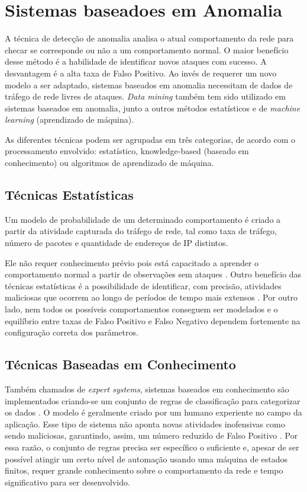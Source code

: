 \chapter{Sistemas baseadoes em Anomalia}
\label{ch:anids}
 A técnica de detecção de anomalia analisa o atual comportamento da rede para checar se corresponde ou não a um
 comportamento normal. O maior benefício desse método é a habilidade de identificar novos ataques com sucesso.
 A desvantagem é a alta taxa de Falso Positivo. Ao invés de requerer um novo modelo a ser adaptado, sistemas baseados
 em anomalia necessitam de dados de tráfego de rede livres de ataques. \textit{Data mining} também tem sido
 utilizado em sistemas baseados em anomalia, junto a outros métodos estatísticos e de \textit{machine learning}
 (aprendizado de máquina).
 \par As diferentes técnicas podem ser agrupadas em três categorias, de acordo com o processamento envolvido:
 estatístico, knowledge-based (baseado em conhecimento) ou algoritmos de aprendizado de máquina.

\section{Técnicas Estatísticas}
Um modelo de probabilidade de um determinado comportamento é criado a partir da atividade capturada do tráfego de rede,
 tal como taxa de tráfego, número de pacotes e quantidade de endereços de IP distintos.
 \par Ele não requer conhecimento prévio pois está capacitado a aprender o comportamento normal a partir de observações
 sem ataques \cite{lunt89}. Outro benefício das técnicas estatísticas é a possibilidade de identificar, com precisão, atividades
 maliciosas que ocorrem ao longo de períodos de tempo mais extensos \cite{catania12}. Por outro lado, nem todos os possíveis
 comportamentos conseguem ser modelados e o equilíbrio entre taxas de Falso Positivo e Falso Negativo dependem
 fortemente na configuração correta dos parâmetros.

 \section{Técnicas Baseadas em Conhecimento}
 Também chamados de \emph{expert systems}, sistemas baseados em conhecimento são implementados criando-se um conjunto de
 regras de classificação para categorizar os dados \cite{lunt89}. O modelo é geralmente criado por um humano experiente no campo
 da aplicação. Esse tipo de sistema não aponta novas atividades inofensivas como sendo maliciosas, garantindo, assim,
 um número reduzido de Falso Positivo \cite{catania12}. Por essa razão, o conjunto de regras precisa ser específico o suficiente e,
 apesar de ser possível atingir um certo nível de automação usando uma máquina de estados finitos, requer
 grande conhecimento sobre o comportamento da rede e tempo significativo para ser desenvolvido.


